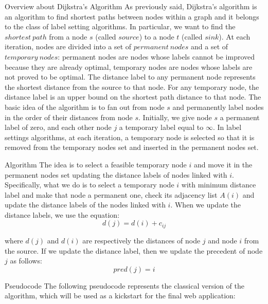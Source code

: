 \documentclass[9pt]{extarticle}
\begin{document}
    \begin{section}{Overview about Dijkstra's Algorithm}
        As previously said, Dijkstra's algorithm is an algorithm to find shortest paths between nodes within a graph 
        and it belongs to the class of label setting algorithms.
        In particular, we want to find the $shortest\ path$ from a node $s$ (called $source$) to a node $t$ (called 
        $sink$).
        At each iteration, nodes are divided into a set of $permanent\ nodes$ and a set of $temporary\ nodes$:
        permanent nodes are nodes whose labels cannot be improved because they are already optimal,
        temporary nodes are nodes whose labels are not proved to be optimal\cite{book}. 
        The distance label to any permanent node represents the shortest distance from the source to that node. 
        For any temporary node, the distance label is an upper bound on the shortest path distance to that node.
        The basic idea of the algorithm is to fan out from node $s$ and permanently label nodes in the order of their 
        distances from node $s$\cite{book}.
        Initially, we give node $s$ a permanent label of zero, and each other node $j$ a temporary label equal to $\infty$.
        In label settings algorithms, at each iteration, a temporary node is selected so that it is removed from the 
        temporary nodes set and inserted in the permanent nodes set\cite{book}.
        
        \begin{subsection}{Algorithm}
            The idea is to select a feasible temporary node $i$ and move it in the permanent nodes set updating the 
            distance labels of nodes linked with $i$. 
            Specifically, what we do is to select a temporary node $i$ with minimum distance label and make that node a 
            permanent one, check its adjacency list $A(i)$ and update the distance labels of the nodes linked with $i$. 
            When we update the distance labels, we use the equation:
            $$
                d(j) = d(i) + c_{ij}
            $$

            where $d(j)$ and $d(i)$ are respectively the distances of node $j$ and node $i$ from the source. 
            If we update the distance label, then we update the precedent of node $j$ as follows: 
            $$
                pred(j) = i
            $$
        \end{subsection}

        \begin{subsection}{Pseudocode}
            The following pseudocode\cite{book} represents the classical version of the algorithm, which will be used as a kickstart
            for the final web application:
            \vspace{10px}


\end{subsection}
\end{section}
\end{document}
